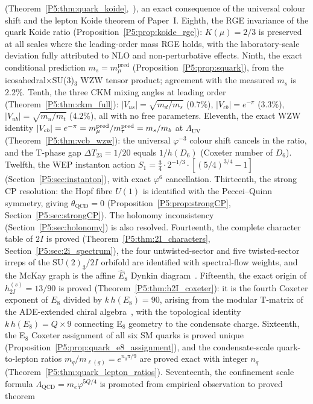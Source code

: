 \documentclass[11pt,a4paper]{article}
\theoremstyle{definition}
\theoremstyle{remark}
\newcommand{\vp}{\varphi}
\newcommand{\LUV}{\Lambda_{\mathrm{UV}}}
\newcommand{\LQCD}{\Lambda_{\mathrm{QCD}}}
\begin{document}
(Theorem~\ref{P5:thm:quark_koide},~\cite{Koide1983}), an exact consequence of the universal
colour shift and the lepton Koide theorem of Paper~I.
Eighth, the RGE invariance of the quark Koide ratio
(Proposition~\ref{P5:prop:koide_rge}): $K(\mu)=2/3$ is preserved
at all scales where the leading-order mass RGE holds, with the
laboratory-scale deviation fully attributed to NLO and non-perturbative effects.
Ninth, the exact conditional prediction $m_s=m_\mu^{\mathrm{pred}}$
(Proposition~\ref{P5:prop:squark}), from the icosahedral$\times$SU(3)$_3$
WZW tensor product; agreement with the measured $m_s$ is $2.2\%$.
Tenth, the three CKM mixing angles at leading order
(Theorem~\ref{P5:thm:ckm_full}): $|V_{us}|=\sqrt{m_d/m_s}$ ($0.7\%$),
$|V_{cb}|=e^{-\pi}$ ($3.3\%$), $|V_{ub}|=\sqrt{m_u/m_t}$ ($4.2\%$),
all with no free parameters.
Eleventh, the exact WZW identity
$|V_{cb}|=e^{-\pi}=m_\mu^{\rm pred}/m_\tau^{\rm pred}=m_s/m_b$ at $\LUV$
(Theorem~\ref{P5:thm:vcb_wzw}): the universal $\vp^{-3}$ colour shift
cancels in the ratio, and the T-phase gap $\Delta T_{23}=1/20$
equals $1/h(D_6)$ (Coxeter number of $D_6$).
Twelfth, the WEP instanton action
$S_1 = \tfrac{3}{4}\cdot 2^{-1/3}\cdot[(5/4)^{3/4}-1]$
(Section~\ref{P5:sec:instanton}), with exact $\vp^6$ cancellation.
Thirteenth, the strong CP resolution: the Hopf fibre $U(1)$ is identified
with the Peccei--Quinn symmetry, giving $\theta_{\mathrm{QCD}}=0$
(Proposition~\ref{P5:prop:strongCP}, Section~\ref{P5:sec:strongCP}).
The holonomy inconsistency (Section~\ref{P5:sec:holonomy}) is also resolved.
Fourteenth, the complete character table of $2I$ is proved
(Theorem~\ref{P5:thm:2I_characters}, Section~\ref{P5:sec:2i_spectrum}),
the four untwisted-sector and five twisted-sector irreps of the
$\mathrm{SU}(2)_3/2I$ orbifold are identified with spectral-flow weights,
and the McKay graph is the affine $\hat{E}_8$ Dynkin diagram~\cite{McKay1980}.
Fifteenth, the exact origin of $h_{2I}^{(s)}=13/90$ is proved
(Theorem~\ref{P5:thm:h2I_coxeter}): it is the fourth Coxeter exponent of $E_8$
divided by $k\,h(E_8)=90$, arising from the modular T-matrix of the
ADE-extended chiral algebra~\cite{CIZ1987}, with the topological identity
$k\,h(E_8)=Q\times9$ connecting E$_8$ geometry to the condensate charge.
Sixteenth, the E$_8$ Coxeter assignment of all six SM quarks is proved
unique (Proposition~\ref{P5:prop:quark_e8_assignment}), and the condensate-scale
quark-to-lepton ratios $m_q/m_{\ell(g)}=e^{n_q\pi/9}$
are proved exact with integer $n_q$ (Theorem~\ref{P5:thm:quark_lepton_ratios}).
Seventeenth, the confinement scale formula
$\LQCD = m_e\vp^{5Q/4}$ is promoted from empirical observation to proved theorem
\end{document}
